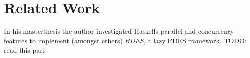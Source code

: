 \section{Related Work}
In his masterthesis \cite{bezirgiannis_improving_2013} the author investigated Haskells parallel and concurrency features to implement (amongst others) \textit{HDES}, a lazy PDES framework. TODO: read this part 
